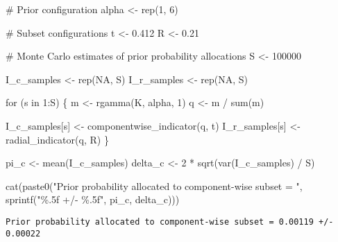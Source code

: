 \documentclass[
  letterpaper,
  DIV=11,
  numbers=noendperiod]{scrartcl}
\newenvironment{Shaded}{\begin{snugshade}}{\end{snugshade}}
\newcommand{\CommentTok}[1]{\textcolor[rgb]{0.37,0.37,0.37}{#1}}
\newcommand{\ConstantTok}[1]{\textcolor[rgb]{0.56,0.35,0.01}{#1}}
\newcommand{\ControlFlowTok}[1]{\textcolor[rgb]{0.00,0.23,0.31}{#1}}
\newcommand{\DecValTok}[1]{\textcolor[rgb]{0.68,0.00,0.00}{#1}}
\newcommand{\FloatTok}[1]{\textcolor[rgb]{0.68,0.00,0.00}{#1}}
\newcommand{\FunctionTok}[1]{\textcolor[rgb]{0.28,0.35,0.67}{#1}}
\newcommand{\NormalTok}[1]{\textcolor[rgb]{0.00,0.23,0.31}{#1}}
\newcommand{\OtherTok}[1]{\textcolor[rgb]{0.00,0.23,0.31}{#1}}
\newcommand{\SpecialCharTok}[1]{\textcolor[rgb]{0.37,0.37,0.37}{#1}}
\newcommand{\StringTok}[1]{\textcolor[rgb]{0.13,0.47,0.30}{#1}}
\begin{document}
\begin{Shaded}
\begin{Highlighting}[]
\CommentTok{\# Prior configuration}
\NormalTok{alpha }\OtherTok{\textless{}{-}} \FunctionTok{rep}\NormalTok{(}\DecValTok{1}\NormalTok{, }\DecValTok{6}\NormalTok{)}

\CommentTok{\# Subset configurations}
\NormalTok{t }\OtherTok{\textless{}{-}} \FloatTok{0.412}
\NormalTok{R }\OtherTok{\textless{}{-}} \FloatTok{0.21}

\CommentTok{\# Monte Carlo estimates of prior probability allocations}
\NormalTok{S }\OtherTok{\textless{}{-}} \DecValTok{100000}

\NormalTok{I\_c\_samples }\OtherTok{\textless{}{-}} \FunctionTok{rep}\NormalTok{(}\ConstantTok{NA}\NormalTok{, S)}
\NormalTok{I\_r\_samples }\OtherTok{\textless{}{-}} \FunctionTok{rep}\NormalTok{(}\ConstantTok{NA}\NormalTok{, S)}

\ControlFlowTok{for}\NormalTok{ (s }\ControlFlowTok{in} \DecValTok{1}\SpecialCharTok{:}\NormalTok{S) \{}
\NormalTok{  m }\OtherTok{\textless{}{-}} \FunctionTok{rgamma}\NormalTok{(K, alpha, }\DecValTok{1}\NormalTok{)}
\NormalTok{  q }\OtherTok{\textless{}{-}}\NormalTok{ m }\SpecialCharTok{/} \FunctionTok{sum}\NormalTok{(m)}

\NormalTok{  I\_c\_samples[s] }\OtherTok{\textless{}{-}} \FunctionTok{componentwise\_indicator}\NormalTok{(q, t)}
\NormalTok{  I\_r\_samples[s] }\OtherTok{\textless{}{-}} \FunctionTok{radial\_indicator}\NormalTok{(q, R)}
\NormalTok{\}}
\end{Highlighting}
\end{Shaded}

\begin{Shaded}
\begin{Highlighting}[]
\NormalTok{pi\_c }\OtherTok{\textless{}{-}} \FunctionTok{mean}\NormalTok{(I\_c\_samples)}
\NormalTok{delta\_c }\OtherTok{\textless{}{-}} \DecValTok{2} \SpecialCharTok{*} \FunctionTok{sqrt}\NormalTok{(}\FunctionTok{var}\NormalTok{(I\_c\_samples) }\SpecialCharTok{/}\NormalTok{ S)}

\FunctionTok{cat}\NormalTok{(}\FunctionTok{paste0}\NormalTok{(}\StringTok{"Prior probability allocated to component{-}wise subset = "}\NormalTok{,}
           \FunctionTok{sprintf}\NormalTok{(}\StringTok{"\%.5f +/{-} \%.5f"}\NormalTok{, pi\_c, delta\_c)))}
\end{Highlighting}
\end{Shaded}

\begin{verbatim}
Prior probability allocated to component-wise subset = 0.00119 +/- 0.00022
\end{verbatim}
\end{document}
